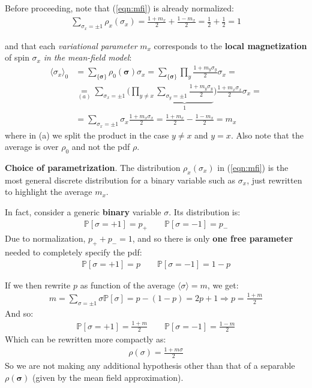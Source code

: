 \documentclass[../template.tex]{subfiles}
\begin{document}
Before proceeding, note that (\ref{eqn:mfi}) is already normalized:
\begin{align*}
    \sum_{\sigma_x = \pm 1}\rho_x(\sigma_x) = \frac{1+m_x}{2} + \frac{1-m_x}{2} = \frac{1}{2} + \frac{1}{2} = 1    
\end{align*}

and that each \textit{variational parameter} $m_x$ corresponds to the \textbf{local magnetization} of spin $\sigma_x$ \textit{in the mean-field model}: 
\begin{align}\nonumber
    \langle \sigma_x \rangle_0 &= \sum_{\{\bm{\sigma}\}} \rho_0(\bm{\sigma}) \sigma_x = \sum_{\{\bm{\sigma}\}} \prod_y \frac{1+m_y \sigma_y}{2} \sigma_x =  \\ \nonumber
    &\underset{(a)}{=}  \sum_{\sigma_x = \pm 1} \Bigg(\prod_{y \neq x} \underbrace{\sum_{\sigma_y = \pm 1} \frac{1+m_y \sigma_y}{2}}_{1} \Bigg) \frac{1+m_x \sigma_x}{2} \sigma_x =\\ 
    &=
    \sum_{\sigma_x = \pm 1} \sigma_x \frac{1+m_x \sigma_x}{2} = \frac{1+m_x}{2} - \frac{1-m_x}{2} =  m_x \label{eqn:local-average}
\end{align}
where in (a) we split the product in the case $y \neq x$ and $y = x$. Also note that the average is over $\rho_0$ and not the  pdf $\rho$.

\begin{expl}\textbf{Choice of parametrization}.  
    The distribution $\rho_x(\sigma_x)$ in (\ref{eqn:mfi}) is the most general discrete distribution for a binary variable such as $\sigma_x$, just rewritten to highlight the average $m_x$.

    In fact, consider a generic \textbf{binary} variable $\sigma$. Its distribution is:
    \begin{align*}
        \mathbb{P}[\sigma = +1] = p_+ \qquad \mathbb{P}[\sigma=-1] = p_-
    \end{align*}
    Due to normalization, $p_+ + p_- = 1$, and so there is only \textbf{one free parameter} needed to completely specify the pdf:
    \begin{align*}
        \mathbb{P}[\sigma = +1] = p \qquad \mathbb{P}[\sigma = -1] = 1-p
    \end{align*}  
    
    If we then rewrite $p$ as function of the average $\langle \sigma \rangle = m$, we get:
    \begin{align*}
        m = \sum_{\sigma = \pm 1} \sigma\mathbb{P}[\sigma] = p - (1-p) = 2p + 1 \Rightarrow p = \frac{1+m}{2} 
    \end{align*}
    And so:
    \begin{align*}
        \mathbb{P}[\sigma = +1] = \frac{1+m}{2} \qquad \mathbb{P}[\sigma = -1] = \frac{1-m}{2}  
    \end{align*}
    Which can be rewritten more compactly as:
    \begin{align*}
        \rho(\sigma) = \frac{1+m \sigma}{2} 
    \end{align*}
    So we are not making any additional hypothesis other than that of a separable $\rho(\bm{\sigma})$ (given by the mean field approximation).
\end{expl}
\end{document}

